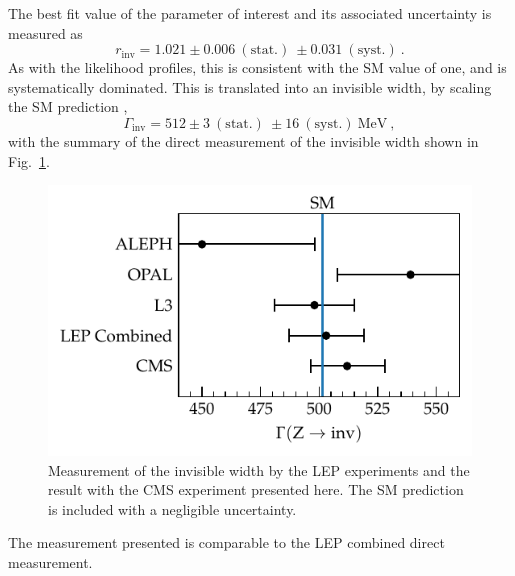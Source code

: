The best fit value of the parameter of interest and its associated uncertainty is measured as
%
\begin{equation}
    r_{\mathrm{inv}} = 1.021\pm 0.006\ (\mathrm{stat.})\ \pm 0.031\ (\mathrm{syst.})\ .
\end{equation}
%
As with the likelihood profiles, this is consistent with the SM value of one, and is systematically dominated. This is translated into an invisible width, by scaling the SM prediction \cite{PhysRevD.98.030001},
%
\begin{equation}
    \Gamma_{\mathrm{inv}} = 512 \pm 3\ (\mathrm{stat.})\ \pm 16\ (\mathrm{syst.})\ \mathrm{MeV}\ ,
\end{equation}
%
with the summary of the direct measurement of the invisible width shown in Fig.~\ref{fig:finalfit-zinv}.
%
\begin{figure}
    \centering
    \includegraphics{chapters/043_results/images/finalfit-zinv.pdf}
    \caption[Summary of the invisible width measurements.]{
        Measurement of the \PZ invisible width by the LEP experiments and the result with the CMS experiment presented here. The SM prediction is included with a negligible uncertainty.
    }
    \label{fig:finalfit-zinv}
\end{figure}
%
The measurement presented is comparable to the LEP combined direct measurement.
